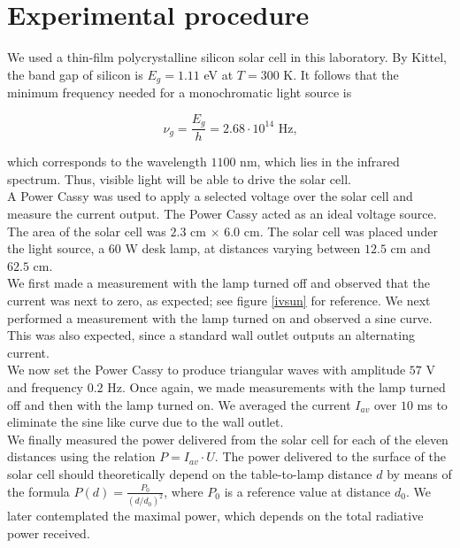 \documentclass[a4paper]{article}
\begin{document}
\section{Experimental procedure}

We used a thin-film polycrystalline silicon solar cell in this laboratory. By Kittel, the band gap of silicon is $E_g = 1.11$ eV at $T = 300$ K. It follows that the minimum frequency needed for a monochromatic light source is

$$\nu_g = \frac{E_g}{h} = 2.68 \cdot 10^{14}\text{ Hz,}$$

which corresponds to the wavelength $1100$ nm, which lies in the infrared spectrum. Thus, visible light will be able to drive the solar cell. \\

A Power Cassy was used to apply a selected voltage over the solar cell and measure the current output. The Power Cassy acted as an ideal voltage source. The area of the solar cell was $2.3$ cm $\times$ $6.0$ cm. The solar cell was placed under the light source, a $60$ W desk lamp, at distances varying between $12.5$ cm and $62.5$ cm. \\

We first made a measurement with the lamp turned off and observed that the current was next to zero, as expected; see figure \ref{ivsun} for reference. We next performed a measurement with the lamp turned on and observed a sine curve. This was also expected, since a standard wall outlet outputs an alternating current. \\

We now set the Power Cassy to produce triangular waves with amplitude $57$ V and frequency $0.2$ Hz. Once again, we made measurements with the lamp turned off and then with the lamp turned on. We averaged the current $I_{av}$ over $10$ ms to eliminate the sine like curve due to the wall outlet. \\

We finally measured the power delivered from the solar cell for each of the eleven distances using the relation $P = I_{av} \cdot U$. The power delivered to the surface of the solar cell should theoretically depend on the table-to-lamp distance $d$ by means of the formula $P(d) = \frac{P_0}{(d/d_0)^2}$, where $P_0$ is a reference value at distance $d_0$. We later contemplated the maximal power, which depends on the total radiative power received.
\end{document}
